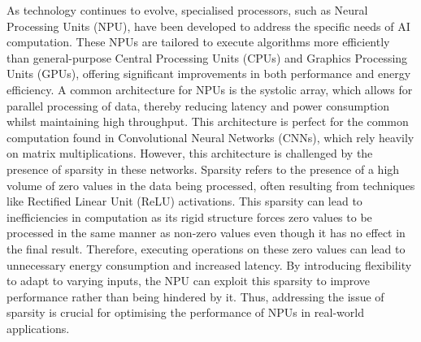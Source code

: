 \documentclass[12pt, a4paper, ukenglish]{article}
\begin{document}
    As technology continues to evolve, specialised processors, such as Neural Processing Units (NPU), have been developed to address the specific needs of AI computation. These NPUs are tailored to execute algorithms more efficiently than general-purpose Central Processing Units (CPUs) and Graphics Processing Units (GPUs), offering significant improvements in both performance and energy efficiency. A common architecture for NPUs is the systolic array, which allows for parallel processing of data, thereby reducing latency and power consumption whilst maintaining high throughput. This architecture is perfect for the common computation found in Convolutional Neural Networks (CNNs), which rely heavily on matrix multiplications. However, this architecture is challenged by the presence of sparsity in these networks. Sparsity refers to the presence of a high volume of zero values in the data being processed, often resulting from techniques like Rectified Linear Unit (ReLU) activations. This sparsity can lead to inefficiencies in computation as its rigid structure forces zero values to be processed in the same manner as non-zero values even though it has no effect in the final result. Therefore, executing operations on these zero values can lead to unnecessary energy consumption and increased latency. By introducing flexibility to adapt to varying inputs, the NPU can exploit this sparsity to improve performance rather than being hindered by it. Thus, addressing the issue of sparsity is crucial for optimising the performance of NPUs in real-world applications.
\end{document}
